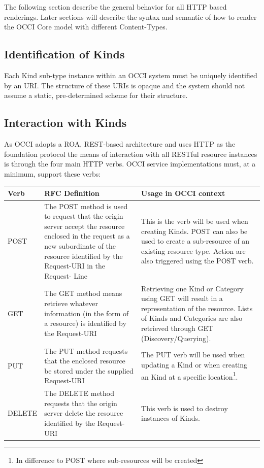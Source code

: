 \documentclass[10pt,a4paper]{article}
\begin{document}
The following section describe the general behavior for all HTTP based renderings. Later sections will describe the syntax and semantic of how to render the OCCI Core model with different Content-Types.

\subsection{Identification of Kinds}
Each Kind sub-type instance within an OCCI system must be uniquely identified by an URI. The structure of these URIs is opaque and the system should not assume a static, pre-determined scheme for their structure.

\subsection{Interaction with Kinds}
As OCCI adopts a ROA, REST-based architecture and uses HTTP as the foundation protocol the means of interaction with all RESTful resource instances is through the four main HTTP verbs. OCCI service implementations must, at a minimum, support these verbs:

\begin{tabular}{l|p{3.2in}|p{2in}}
Verb & RFC Definition & Usage in OCCI context \\
\hline
POST & The POST method is used to request that the origin server accept the resource enclosed in the request as a new subordinate of the resource identified by the Request-URI in the Request- Line & This is the verb will be used when creating Kinds. POST can also be used to create a sub-resource of an existing resource type. Action are also triggered using the POST verb. \\
GET & The GET method means retrieve whatever information (in the form of a resource) is identified by the Request-URI & Retrieving one Kind or Category using GET will result in a representation of the resource. Lists of Kinds and Categories are also retrieved through GET (Discovery/Querying). \\
PUT & The PUT method requests that the enclosed resource be stored under the supplied Request-URI & The PUT verb will be used when updating a Kind or when creating an Kind at a specific location\footnote{In difference to POST where sub-resources will be created}. \\
DELETE & The DELETE method requests that the origin server delete the resource identified by the Request-URI & This verb is used to destroy instances of Kinds. \\ 
\end{tabular}
\end{document}
